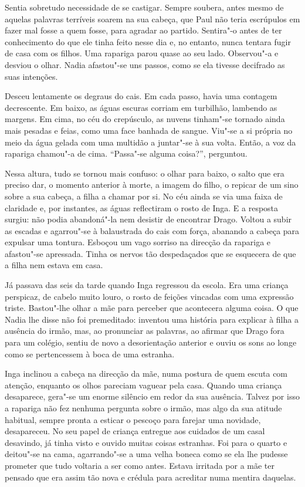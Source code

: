 Sentia sobretudo necessidade de se castigar. Sempre soubera, antes mesmo
de aquelas palavras terríveis soarem na sua cabeça, que Paul não teria
escrúpulos em fazer mal fosse a quem fosse, para agradar ao partido.
Sentira"-o antes de ter conhecimento do que ele tinha feito nesse dia e,
no entanto, nunca tentara fugir de casa com os filhos. Uma rapariga
parou quase ao seu lado. Observou"-a e desviou o olhar. Nadia afastou"-se
uns passos, como se ela tivesse decifrado as suas intenções.

Desceu lentamente os degraus do cais. Em cada passo, havia uma contagem
decrescente. Em baixo, as águas escuras corriam em turbilhão, lambendo
as margens. Em cima, no céu do crepúsculo, as nuvens tinham"-se tornado
ainda mais pesadas e feias, como uma face banhada de sangue. Viu"-se a si
própria no meio da água gelada com uma multidão a juntar"-se à sua
volta. Então, a voz da rapariga chamou"-a de cima. ``Passa"-se alguma
coisa?'', perguntou.

Nessa altura, tudo se tornou mais confuso: o olhar
para baixo, o salto que era preciso dar, o momento anterior à
morte, a imagem do filho, o repicar de um sino sobre a sua cabeça, a
filha a chamar por si. No céu ainda se via uma faixa de claridade e, por
instantes, as águas reflectiram o rosto de Inga. E a resposta surgiu:
não podia abandoná"-la nem desistir de encontrar Drago. Voltou a subir as
escadas e agarrou"-se à balaustrada do cais com força, abanando a cabeça
para expulsar uma tontura. Esboçou um vago sorriso na direcção da
rapariga e afastou"-se apressada. Tinha os nervos tão despedaçados que se
esquecera de que a filha nem estava em casa.

Já passava das seis da tarde quando Inga regressou da escola. Era uma
criança perspicaz, de cabelo muito louro, o rosto de feições vincadas
com uma expressão triste. Bastou"-lhe olhar a mãe para perceber que
acontecera alguma coisa. O que Nadia lhe disse não foi premeditado:
inventou uma história para explicar à filha a ausência do irmão, mas, ao
pronunciar as palavras, ao afirmar que Drago fora para um colégio,
sentiu de novo a desorientação anterior e ouviu os sons ao longe como
se pertencessem à boca de uma estranha.

Inga inclinou a cabeça na direcção da mãe, numa postura de quem escuta
com atenção, enquanto os olhos pareciam vaguear pela casa. Quando uma
criança desaparece, gera"-se um enorme silêncio em redor da sua
ausência. Talvez por isso a rapariga não fez nenhuma pergunta sobre o
irmão, mas algo da sua atitude habitual, sempre pronta a esticar o
pescoço para farejar uma novidade, desapareceu. No seu papel de
criança entregue aos cuidados de um casal desavindo, já tinha visto e
ouvido muitas coisas estranhas. Foi para o quarto e deitou"-se na cama,
agarrando"-se a uma velha boneca como se ela lhe pudesse prometer que tudo
voltaria a ser como antes. Estava irritada por a mãe ter pensado que
era assim tão nova e crédula para acreditar numa mentira daquelas.

